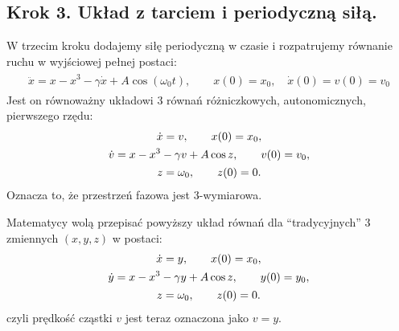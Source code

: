 \documentclass[a4paper,12pt,polish]{sphinxmanual}
\begin{document}
\subsection{Krok 3. Układ z tarciem i periodyczną siłą.}
\label{ch2/chII011:krok-3-uklad-z-tarciem-i-periodyczna-sila}
W trzecim kroku dodajemy siłę periodyczną w czasie  i rozpatrujemy równanie ruchu w wyjściowej pełnej postaci:
\label{ch2/chII011:equation-eqn16}\begin{gather}
\begin{split}\ddot x =  x - x^3 -\gamma \dot x  +  A \cos (\omega_0 t) , \qquad x(0) = x_0, \quad  \dot x(0) = v(0) =  v_0\end{split}\label{ch2/chII011-eqn16}
\end{gather}
Jest on równoważny układowi 3 równań różniczkowych, autonomicznych, pierwszego rzędu:
\label{ch2/chII011:equation-eqn17}\begin{gather}
\begin{split}\dot x = v, \qquad x(0) = x_0,\end{split}\label{ch2/chII011-eqn17}\\\begin{split}\dot v = x - x^3 -\gamma v + A \cos z , \qquad v(0) = v_0,\end{split}\notag\\\begin{split}z = \omega_0, \qquad z(0) = 0.\end{split}\notag
\end{gather}
Oznacza to, że przestrzeń fazowa jest 3-wymiarowa.

Matematycy wolą przepisać powyższy układ równań dla ``tradycyjnych''  3 zmiennych $(x, y, z)$ w postaci:
\label{ch2/chII011:equation-eqn18}\begin{gather}
\begin{split}\dot x = y, \qquad x(0) = x_0,\end{split}\label{ch2/chII011-eqn18}\\\begin{split}\dot y = x - x^3 -\gamma y + A \cos z , \qquad y(0) = y_0,\end{split}\notag\\\begin{split}z = \omega_0, \qquad z(0) = 0.\end{split}\notag
\end{gather}
czyli prędkość cząstki $v$ jest teraz oznaczona jako $v=y$.
\end{document}
